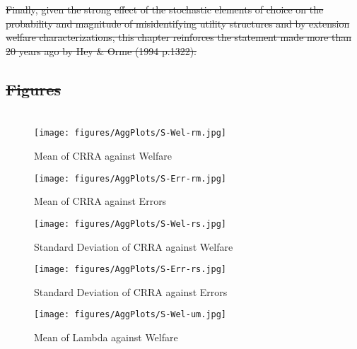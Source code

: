 \documentclass[11pt,a4paper]{report}
\providecommand{\DIFaddtex}[1]{{\protect\color{blue}\uwave{#1}}} %
\providecommand{\DIFdeltex}[1]{{\protect\color{red}\sout{#1}}}                      %
\providecommand{\DIFaddbegin}{} %
\providecommand{\DIFaddend}{} %
\providecommand{\DIFdelbegin}{} %
\providecommand{\DIFdelend}{} %
\providecommand{\DIFadd}[1]{\texorpdfstring{\DIFaddtex{#1}}{#1}} %
\providecommand{\DIFdel}[1]{\texorpdfstring{\DIFdeltex{#1}}{}} %
\newcommand{\DIFscaledelfig}{0.5}
\newlength{\DIFdelgraphicswidth} %
\newlength{\DIFdelgraphicsheight} %
\newcommand{\DIFaddincludegraphics}[2][]{{\color{blue}\fbox{\DIFOincludegraphics[#1]{#2}}}} %
\newcommand{\DIFdelincludegraphics}[2][]{%
\sbox{\DIFdelgraphicsbox}{\DIFOincludegraphics[#1]{#2}}%
\settoboxwidth{\DIFdelgraphicswidth}{\DIFdelgraphicsbox} %
\settoboxtotalheight{\DIFdelgraphicsheight}{\DIFdelgraphicsbox} %
\scalebox{\DIFscaledelfig}{%
\parbox[b]{\DIFdelgraphicswidth}{\usebox{\DIFdelgraphicsbox}\\[-\baselineskip] \rule{\DIFdelgraphicswidth}{0em}}\llap{\resizebox{\DIFdelgraphicswidth}{\DIFdelgraphicsheight}{%
\setlength{\unitlength}{\DIFdelgraphicswidth}%
\begin{picture}(1,1)%
\thicklines\linethickness{2pt} %
{\color[rgb]{1,0,0}\put(0,0){\framebox(1,1){}}}%
{\color[rgb]{1,0,0}\put(0,0){\line( 1,1){1}}}%
{\color[rgb]{1,0,0}\put(0,1){\line(1,-1){1}}}%
\end{picture}%
}\hspace*{3pt}}} %
} %
\DeclareRobustCommand{\DIFaddbegin}{\DIFOaddbegin \let\includegraphics\DIFaddincludegraphics} %
\DeclareRobustCommand{\DIFaddend}{\DIFOaddend \let\includegraphics\DIFOincludegraphics} %
\DeclareRobustCommand{\DIFdelbegin}{\DIFOdelbegin \let\includegraphics\DIFdelincludegraphics} %
\DeclareRobustCommand{\DIFdelend}{\DIFOaddend \let\includegraphics\DIFOincludegraphics} %
\begin{document}
\DIFdelbegin \DIFdel{Finally, given the strong effect of the stochastic elements of choice on the probability and magnitude of misidentifying utility structures and by extension welfare characterizations, this chapter reinforces the statement made more than 20 years ago by Hey \& Orme (1994 p.1322):
}%

\DIFdelend \newpage

\DIFdelbegin \subsection{\DIFdel{Figures}}
\addtocounter{subsection}{-1}%
\DIFdelend \DIFaddbegin \section{\DIFadd{Figures}}
\DIFaddend 

\begin{figure}[hp!]
	\center
	\caption{Mean of CRRA against Welfare}
	\texttt{[image: figures/AggPlots/S-Wel-rm.jpg]}
	\label{fig:S-Wel-rm}
\end{figure}

\begin{figure}[hp!]
	\center
	\caption{Mean of CRRA against Errors}
	\texttt{[image: figures/AggPlots/S-Err-rm.jpg]}
	\label{fig:S-Err-rm}
\end{figure}

\begin{figure}[hp!]
	\center
	\caption{Standard Deviation of CRRA against Welfare}
	\texttt{[image: figures/AggPlots/S-Wel-rs.jpg]}
	\label{fig:S-Wel-rs}
\end{figure}

\begin{figure}[hp!]
	\center
	\caption{Standard Deviation of CRRA against Errors}
	\texttt{[image: figures/AggPlots/S-Err-rs.jpg]}
	\label{fig:S-Err-rs}
\end{figure}

\begin{figure}[hp!]
	\center
	\caption{Mean of Lambda against Welfare}
	\texttt{[image: figures/AggPlots/S-Wel-um.jpg]}
	\label{fig:S-Wel-um}
\end{figure}
\end{document}
